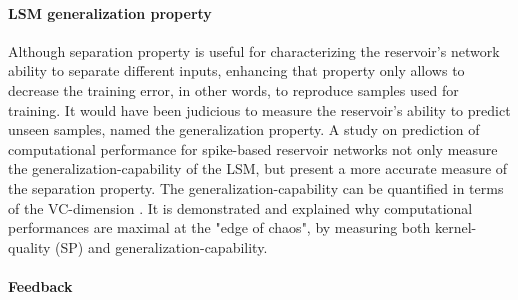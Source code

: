 \documentclass[11pt, a4paper]{article} %
\begin{document}

\paragraph{LSM generalization property}

Although separation property is useful for characterizing the reservoir's network ability to separate different inputs, enhancing that property only allows to decrease the training error, in other words, to reproduce samples used for training. It would have been judicious to measure the reservoir's ability to predict unseen samples, named the generalization property. A study on prediction of computational performance for spike-based reservoir networks \cite{legenstein2007edge} not only measure the generalization-capability of the LSM, but present a more accurate measure of the separation property. The generalization-capability can be quantified in terms of the VC-dimension \cite{vapnikn}. It is demonstrated and explained why computational performances are maximal  at the "edge of chaos", by measuring both kernel-quality (SP) and generalization-capability.

\paragraph{Feedback}
\end{document}
